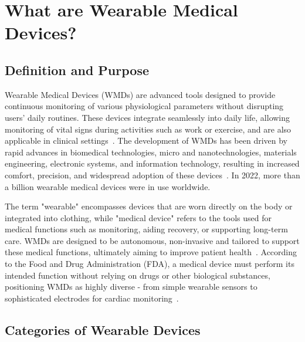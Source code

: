 \documentclass[journal]{IEEEtran}
\begin{document}

\section{What are Wearable Medical Devices?}
    \subsection{Definition and Purpose}

    Wearable Medical Devices (WMDs) are advanced tools designed to provide continuous monitoring of various physiological parameters without disrupting users' daily routines. These devices integrate seamlessly into daily life, allowing monitoring of vital signs during activities such as work or exercise, and are also applicable in clinical settings~\cite{Fotiadis2006}. The development of WMDs has been driven by rapid advances in biomedical technologies, micro and nanotechnologies, materials engineering, electronic systems, and information technology, resulting in increased comfort, precision, and widespread adoption of these devices~\cite{Degerli2020, Fotiadis2006}. In 2022, more than a billion wearable medical devices were in use worldwide.

    The term "wearable" encompasses devices that are worn directly on the body or integrated into clothing, while "medical device" refers to the tools used for medical functions such as monitoring, aiding recovery, or supporting long-term care. WMDs are designed to be autonomous, non-invasive and tailored to support these medical functions, ultimately aiming to improve patient health~\cite{Degerli2020}. According to the Food and Drug Administration (FDA), a medical device must perform its intended function without relying on drugs or other biological substances, positioning WMDs as highly diverse - from simple wearable sensors to sophisticated electrodes for cardiac monitoring~\cite{Khan2016, Ates2022}.

    \subsection{Categories of Wearable Devices}
    
\end{document}
